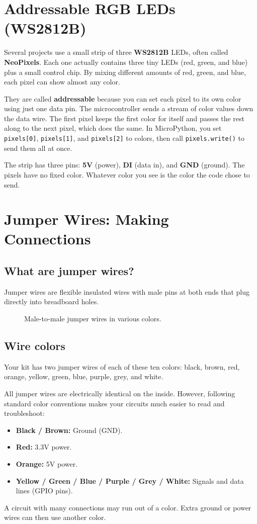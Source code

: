 \section{Addressable RGB LEDs (WS2812B)} \label{ws2812b_basics}
Several projects use a small strip of three \textbf{WS2812B} LEDs, often called \textbf{NeoPixels}.
Each one actually contains three tiny LEDs (red, green, and blue) plus a small control chip. By
mixing different amounts of red, green, and blue, each pixel can show almost any color.

They are called \textbf{addressable} because you can set each pixel to its own color using just one
data pin. The microcontroller sends a stream of color values down the data wire. The first pixel
keeps the first color for itself and passes the rest along to the next pixel, which does the same.
In MicroPython, you set \texttt{pixels[0]}, \texttt{pixels[1]}, and \texttt{pixels[2]} to colors,
then call \texttt{pixels.write()} to send them all at once.

The strip has three pins: \textbf{5V} (power), \textbf{DI} (data in), and \textbf{GND} (ground).
The pixels have no fixed color. Whatever color you see is the color the code chose to send.


\section{Jumper Wires: Making Connections}

\subsection{What are jumper wires?}
Jumper wires are flexible insulated wires with male pins at both ends that plug directly into breadboard holes.

\begin{figure}[H]
\centering
    \caption{Male-to-male jumper wires in various colors.}
    \label{fig:jumper_wires}
\end{figure}

\subsection{Wire colors}
Your kit has two jumper wires of each of these ten colors: black, brown, red, orange, yellow,
green, blue, purple, grey, and white.

All jumper wires are electrically identical on the inside. However, following standard color conventions
makes your circuits much easier to read and troubleshoot:
\begin{itemize}
    \item \textbf{Black / Brown:} Ground (GND).
    \item \textbf{Red:} 3.3V power.
    \item \textbf{Orange:} 5V power.
    \item \textbf{Yellow / Green / Blue / Purple / Grey / White:} Signals and data lines (GPIO pins).
\end{itemize}
A circuit with many connections may run out of a color. Extra ground or power wires can then
use another color.


